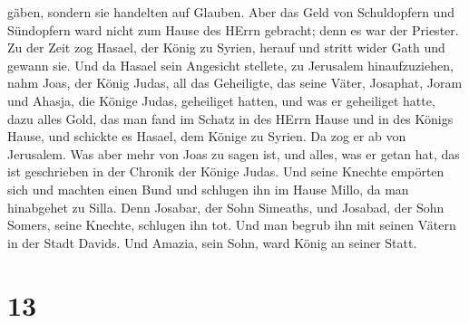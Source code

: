 gäben, sondern sie handelten auf Glauben.  Aber das Geld
von Schuldopfern und Sündopfern ward nicht zum Hause des HErrn gebracht;
denn es war der Priester.  Zu der Zeit zog Hasael, der
König zu Syrien, herauf und stritt wider Gath und gewann sie. Und da
Hasael sein Angesicht stellete, zu Jerusalem hinaufzuziehen,
 nahm Joas, der König Judas, all das Geheiligte, das seine
Väter, Josaphat, Joram und Ahasja, die Könige Judas, geheiliget hatten,
und was er geheiliget hatte, dazu alles Gold, das man fand im Schatz in
des HErrn Hause und in des Königs Hause, und schickte es Hasael, dem
Könige zu Syrien. Da zog er ab von Jerusalem.  Was aber
mehr von Joas zu sagen ist, und alles, was er getan hat, das ist
geschrieben in der Chronik der Könige Judas.  Und seine
Knechte empörten sich und machten einen Bund und schlugen ihn im Hause
Millo, da man hinabgehet zu Silla.  Denn Josabar, der Sohn
Simeaths, und Josabad, der Sohn Somers, seine Knechte, schlugen ihn tot.
Und man begrub ihn mit seinen Vätern in der Stadt Davids. Und Amazia,
sein Sohn, ward König an seiner Statt.

\hypertarget{section-12}{%
\section{13}\label{section-12}}

